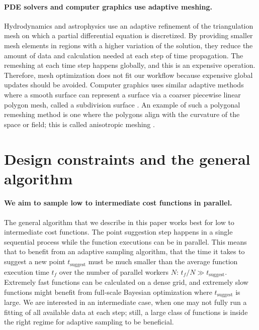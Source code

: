 \documentclass[english, twocolumn, 10pt, aps, superscriptaddress, floatfix, prb, citeautoscript]{revtex4-1}
\renewcommand{\citep}{\cite}
\begin{document}
\paragraph{PDE solvers and computer graphics use adaptive meshing.}

Hydrodynamics \citep{Berger1989, Berger1984} and astrophysics \citep{Klein1999} use an adaptive refinement of the triangulation mesh on which a partial differential equation is discretized.
By providing smaller mesh elements in regions with a higher variation of the solution, they reduce the amount of data and calculation needed at each step of time propagation.
The remeshing at each time step happens globally, and this is an expensive operation.
Therefore, mesh optimization does not fit our workflow because expensive global updates should be avoided.
Computer graphics uses similar adaptive methods where a smooth surface can represent a surface via a coarser piecewise linear polygon mesh, called a subdivision surface \citep{DeRose1998}.
An example of such a polygonal remeshing method is one where the polygons align with the curvature of the space or field; this is called anisotropic meshing \citep{Alliez2003}.

\section{Design constraints and the general algorithm}

\paragraph{We aim to sample low to intermediate cost functions in parallel.}

The general algorithm that we describe in this paper works best for low to intermediate cost functions.
The point suggestion step happens in a single sequential process while the function executions can be in parallel.
This means that to benefit from an adaptive sampling algorithm, that the time it takes to suggest a new point \(t_\textrm{suggest}\) must be much smaller than the average function execution time \(t_f\) over the number of parallel workers \(N\): \(t_f / N \gg t_\textrm{suggest}\).
Extremely fast functions can be calculated on a dense grid, and extremely slow functions might benefit from full-scale Bayesian optimization where \(t_\textrm{suggest}\) is large.
We are interested in an intermediate case, when one may not fully run a fitting of all available data at each step; still, a large class of functions is inside the right regime for adaptive sampling to be beneficial.
\end{document}

